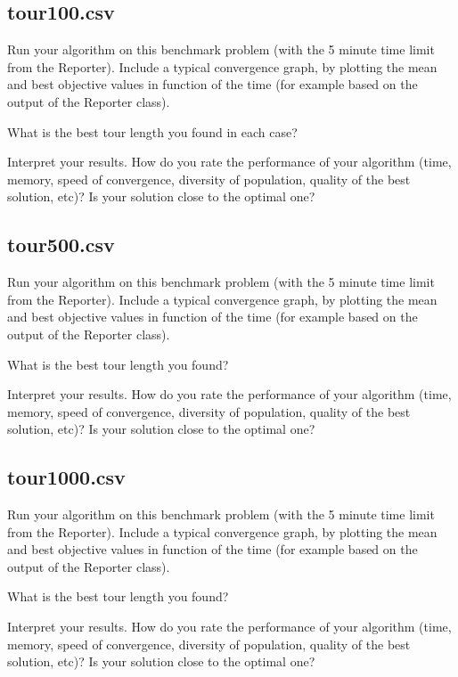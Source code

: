 \documentclass[a4paper,10pt]{article}
\newcommand{\ReplaceMe}[1]{{\color{blue}#1}}
\begin{document}
\subsection{tour100.csv}

\ReplaceMe{Run your algorithm on this benchmark problem (with the 5 minute time limit from the Reporter). Include a typical convergence graph, by plotting the mean and best objective values in function of the time (for example based on the output of the Reporter class). 

What is the best tour length you found in each case? 

Interpret your results. How do you rate the performance of your algorithm (time, memory, speed of convergence, diversity of population, quality of the best solution, etc)? Is your solution close to the optimal one?}

\subsection{tour500.csv}

\ReplaceMe{Run your algorithm on this benchmark problem (with the 5 minute time limit from the Reporter). Include a typical convergence graph, by plotting the mean and best objective values in function of the time (for example based on the output of the Reporter class). 

What is the best tour length you found? 

Interpret your results. How do you rate the performance of your algorithm (time, memory, speed of convergence, diversity of population, quality of the best solution, etc)? Is your solution close to the optimal one?}

\subsection{tour1000.csv}

\ReplaceMe{Run your algorithm on this benchmark problem (with the 5 minute time limit from the Reporter). Include a typical convergence graph, by plotting the mean and best objective values in function of the time (for example based on the output of the Reporter class). 

What is the best tour length you found? 

Interpret your results. How do you rate the performance of your algorithm (time, memory, speed of convergence, diversity of population, quality of the best solution, etc)? Is your solution close to the optimal one? }
\end{document}

